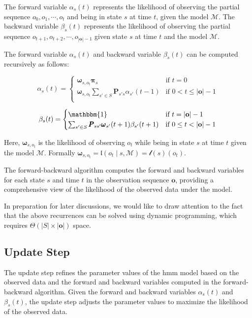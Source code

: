 The forward variable $\alpha_s(t)$ represents the likelihood of observing the partial sequence $o_0, o_1, \cdots, o_t$ and being in state $s$ at time $t$, given the model $\mathcal{M}$.
The backward variable $\beta_s(t)$ represents the likelihood of observing the partial sequence $o_{t+1}, o_{t+2}, \cdots, o_{|\mathbf{o}|-1}$ given state $s$ at time $t$ and the model $\mathcal{M}$.

The forward variable $\alpha_s(t)$ and backward variable $\beta_s(t)$ can be computed recursively as follows:

\begin{equation}
    \alpha_s(t) =
    \begin{cases}
        \pmb{\omega}_{s, o_t} \pmb{\pi}_s & \text{if } t = 0 \\
        \pmb{\omega}_{s, o_t} \sum_{s' \in S} \pmb{P}_{s's}\alpha_{s'}(t - 1) & \text{if } 0 < t \leq |\mathbf{o}| - 1 \\
    \end{cases}
    \label{eq:forward-recursive}
\end{equation}


\begin{equation}
    \beta_s(t) =
    \begin{cases}
        \mathbbm{1} & \text{if } t = |\mathbf{o}| - 1 \\
        \sum_{s' \in S} \pmb{P}_{ss'} \pmb{\omega}_{s'}(t + 1) \beta_{s'}(t + 1) & \text{if } 0 \leq t < |\mathbf{o}| - 1 \\
    \end{cases}
    \label{eq:backward-recursive}
\end{equation}


Here, $\pmb{\omega}_{s, o_t}$ is the likelihood of observing $o_t$ while being in state $s$ at time $t$ given the model $\mathcal{M}$.
Formally $\pmb{\omega}_{s, o_t} = \mathfrak{l}(o_t \mid s, \mathcal{M}) = \mathscr{l}(s)(o_t)$.

The forward-backward algorithm computes the forward and backward variables for each state $s$ and time $t$ in the observation sequence $\mathbf{o}$, providing a comprehensive view of the likelihood of the observed data under the model.

In preparation for later discussions, we would like to draw attention to the fact that the above recurrences can be solved using dynamic programming, which requires $\Theta(|S| \times |\mathbf{o}|)$ space.

\subsection{Update Step}\label{subsec:update-algorithm}
The update step refines the parameter values of the \gls{hmm} model based on the observed data and the forward and backward variables computed in the forward-backward algorithm.
Given the forward and backward variables $\alpha_s(t)$ and $\beta_s(t)$, the update step adjusts the parameter values to maximize the likelihood of the observed data.

